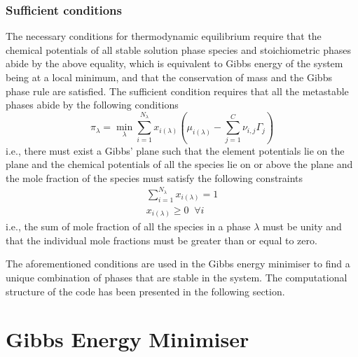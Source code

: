 	\subsubsection*{Sufficient conditions}
    	The necessary conditions for thermodynamic equilibrium require that the chemical potentials of all stable solution phase species and stoichiometric phases abide by the above equality, which is equivalent to Gibbs energy of the system being at a local minimum, and that the conservation of mass and the Gibbs phase rule are satisfied. The sufficient condition requires that all the metastable phases abide by the following conditions 
    	\begin{equation*}
        		\pi_{\lambda} = \min_{\lambda} \sum_{i=1}^{N_{\lambda}}x_{i({\lambda})} \left (\mu_{i({\lambda})} - \sum_{j=1}^C \nu_{i,j}\Gamma_j \right )
    	\end{equation*}
    	i.e., there must exist a Gibbs' plane such that the element potentials lie on the plane and the chemical potentials of all the species lie on or above the plane and the mole fraction of the species must satisfy the following constraints
	\begin{equation*}
        		\begin{aligned}
            		\sum_{i=1}^{N_{\lambda}}x_{i({\lambda})} = 1 \\
			x_{i({\lambda})} \geq 0 \;\; \forall i
        		\end{aligned}
    	\end{equation*}
    	i.e., the sum of mole fraction of all the species in a phase $\lambda$ must be unity and that the individual mole fractions must be greater than or equal to zero.
    
    	The aforementioned conditions are used in the Gibbs energy minimiser to find a unique combination of phases that are stable in the system. The computational structure of the code has been presented in the following section.
	
\section*{Gibbs Energy Minimiser}
